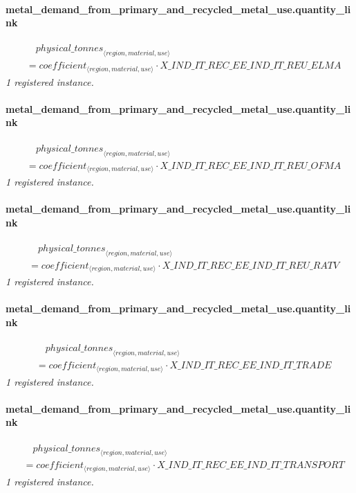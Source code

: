 \documentclass[11pt]{article}
\begin{document}
\paragraph{metal\_demand\_from\_primary\_and\_recycled\_metal\_use.quantity\_link}
\begin{align*}
&\quad {physical\_tonnes}_{\langle region, material, use\rangle}\\
&= coefficient_{\langle region, material, use\rangle} \cdot X\_IND\_IT\_REC\_EE\_IND\_IT\_REU\_ELMA
\end{align*}
\noindent\emph{1 registered instance.}\par
\paragraph{metal\_demand\_from\_primary\_and\_recycled\_metal\_use.quantity\_link}
\begin{align*}
&\quad {physical\_tonnes}_{\langle region, material, use\rangle}\\
&= coefficient_{\langle region, material, use\rangle} \cdot X\_IND\_IT\_REC\_EE\_IND\_IT\_REU\_OFMA
\end{align*}
\noindent\emph{1 registered instance.}\par
\paragraph{metal\_demand\_from\_primary\_and\_recycled\_metal\_use.quantity\_link}
\begin{align*}
&\quad {physical\_tonnes}_{\langle region, material, use\rangle}\\
&= coefficient_{\langle region, material, use\rangle} \cdot X\_IND\_IT\_REC\_EE\_IND\_IT\_REU\_RATV
\end{align*}
\noindent\emph{1 registered instance.}\par
\paragraph{metal\_demand\_from\_primary\_and\_recycled\_metal\_use.quantity\_link}
\begin{align*}
&\quad {physical\_tonnes}_{\langle region, material, use\rangle}\\
&= coefficient_{\langle region, material, use\rangle} \cdot X\_IND\_IT\_REC\_EE\_IND\_IT\_TRADE
\end{align*}
\noindent\emph{1 registered instance.}\par
\paragraph{metal\_demand\_from\_primary\_and\_recycled\_metal\_use.quantity\_link}
\begin{align*}
&\quad {physical\_tonnes}_{\langle region, material, use\rangle}\\
&= coefficient_{\langle region, material, use\rangle} \cdot X\_IND\_IT\_REC\_EE\_IND\_IT\_TRANSPORT
\end{align*}
\noindent\emph{1 registered instance.}\par
\end{document}
